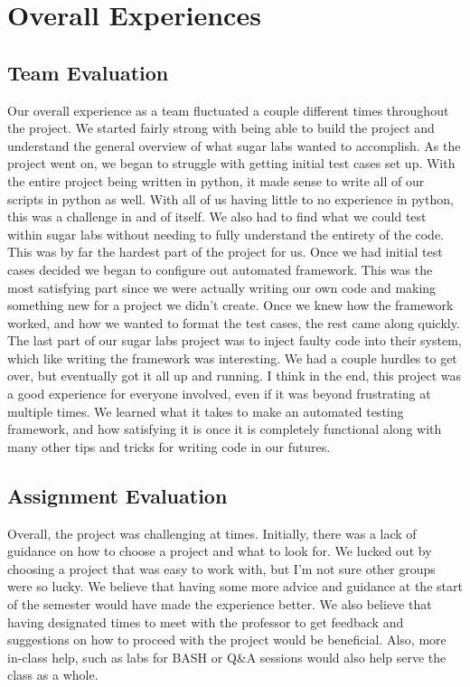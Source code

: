 \documentclass{article}
\begin{document}
\section{Overall Experiences}
\subsection{Team Evaluation}
Our overall experience as a team fluctuated a couple different times throughout the project. We started fairly strong with being able to build the project and understand the general overview of what sugar labs wanted to accomplish. As the project went on, we began to struggle with getting initial test cases set up. With the entire project being written in python, it made sense to write all of our scripts in python as well. With all of us having little to no experience in python, this was a challenge in and of itself. We also had to find what we could test within sugar labs without needing to fully understand the entirety of the code. This was by far the hardest part of the project for us. Once we had initial test cases decided we began to configure out automated framework. This was the most satisfying part since we were actually writing our own code and making something new for a project we didn’t create. Once we knew how the framework worked, and how we wanted to format the test cases, the rest came along quickly. The last part of our sugar labs project was to inject faulty code into their system, which like writing the framework was interesting. We had a couple hurdles to get over, but eventually got it all up and running. I think in the end, this project was a good experience for everyone involved, even if it was beyond frustrating at multiple times. We learned what it takes to make an automated testing framework, and how satisfying it is once it is completely functional along with many other tips and tricks for writing code in our futures. 
\subsection{Assignment Evaluation}
Overall, the project was challenging at times. Initially, there was a lack of guidance on how to choose a project and what to look for. We lucked out by choosing a project that was easy to work with, but I’m not sure other groups were so lucky. We believe that having some more advice and guidance at the start of the semester would have made the experience better. We also believe that having designated times to meet with the professor to get feedback and suggestions on how to proceed with the project would be beneficial. Also, more in-class help, such as labs for BASH or Q\&A sessions would also help serve the class as a whole.
\end{document}
